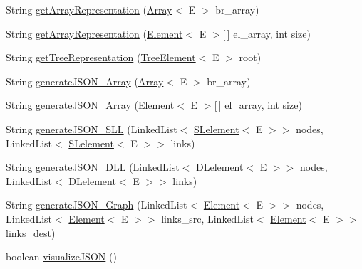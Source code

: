 \begin{DoxyCompactItemize}
\item 
String \hyperlink{classbridges_1_1base_1_1_a_d_t_visualizer_ab3e96c568b11f9ef683191d1e03d5719}{get\+Array\+Representation} (\hyperlink{classbridges_1_1base_1_1_array}{Array}$<$ E $>$ br\+\_\+array)
\item 
String \hyperlink{classbridges_1_1base_1_1_a_d_t_visualizer_ad44bb58d6f9c630cc6bbcae175003243}{get\+Array\+Representation} (\hyperlink{classbridges_1_1base_1_1_element}{Element}$<$ E $>$\mbox{[}$\,$\mbox{]} el\+\_\+array, int size)
\item 
String \hyperlink{classbridges_1_1base_1_1_a_d_t_visualizer_ae01d3d38d5c7c3ac239e86d6be46a50a}{get\+Tree\+Representation} (\hyperlink{classbridges_1_1base_1_1_tree_element}{Tree\+Element}$<$ E $>$ root)
\item 
String \hyperlink{classbridges_1_1base_1_1_a_d_t_visualizer_a1f37c20302432878a91c03544b81cc27}{generate\+J\+S\+O\+N\+\_\+\+Array} (\hyperlink{classbridges_1_1base_1_1_array}{Array}$<$ E $>$ br\+\_\+array)
\item 
String \hyperlink{classbridges_1_1base_1_1_a_d_t_visualizer_a309d4f0521b66bb1329c0362f1ca5d33}{generate\+J\+S\+O\+N\+\_\+\+Array} (\hyperlink{classbridges_1_1base_1_1_element}{Element}$<$ E $>$\mbox{[}$\,$\mbox{]} el\+\_\+array, int size)
\item 
String \hyperlink{classbridges_1_1base_1_1_a_d_t_visualizer_adf2164b7f4b3befb8b2cb2904efd8c91}{generate\+J\+S\+O\+N\+\_\+\+S\+L\+L} (Linked\+List$<$ \hyperlink{classbridges_1_1base_1_1_s_lelement}{S\+Lelement}$<$ E $>$$>$ nodes, Linked\+List$<$ \hyperlink{classbridges_1_1base_1_1_s_lelement}{S\+Lelement}$<$ E $>$$>$ links)
\item 
String \hyperlink{classbridges_1_1base_1_1_a_d_t_visualizer_a866df531965d152d5686304f07e15a4a}{generate\+J\+S\+O\+N\+\_\+\+D\+L\+L} (Linked\+List$<$ \hyperlink{classbridges_1_1base_1_1_d_lelement}{D\+Lelement}$<$ E $>$$>$ nodes, Linked\+List$<$ \hyperlink{classbridges_1_1base_1_1_d_lelement}{D\+Lelement}$<$ E $>$$>$ links)
\item 
String \hyperlink{classbridges_1_1base_1_1_a_d_t_visualizer_aabf7cbfbed0cd28b365206281176834b}{generate\+J\+S\+O\+N\+\_\+\+Graph} (Linked\+List$<$ \hyperlink{classbridges_1_1base_1_1_element}{Element}$<$ E $>$$>$ nodes, Linked\+List$<$ \hyperlink{classbridges_1_1base_1_1_element}{Element}$<$ E $>$$>$ links\+\_\+src, Linked\+List$<$ \hyperlink{classbridges_1_1base_1_1_element}{Element}$<$ E $>$$>$ links\+\_\+dest)
\item 
boolean \hyperlink{classbridges_1_1base_1_1_a_d_t_visualizer_a1aa47f3633239060197b523cb6b86e06}{visualize\+J\+S\+O\+N} ()
$$
\end{DoxyCompactItemize}
